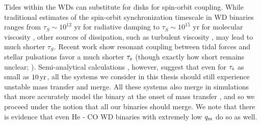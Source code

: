 Tides within the WDs can substitute for disks for spin-orbit coupling.  While traditional estimates of the spin-orbit synchronization timescale in WD binaries ranges from $\tau_{S} \sim 10^{12}$ yr for radiative damping to $\tau_{S} \sim 10^{15}$ yr for molecular viscosity \citep{marsns04}, other sources of dissipation, such as turbulent viscosity \citep{mochl89}, may lead to much shorter $\tau_{S}$.  Recent work \citep{fulll12, burk+13, fulll14} show resonant coupling between tidal forces and stellar pulsations favor a much shorter $\tau_\mathrm{s}$ (though exactly how short remains unclear; \citealt{fulll14}).  Semi-analytical calculations \citep{marsns04,gokhpf07, kremsk15}, however, suggest that even for $\tau_\mathrm{s}$ as small as $10\,\mathrm{yr}$, all the systems we consider in this thesis should still experience unstable mass transfer and merge.  All these systems also merge in simulations that more accurately model the binary at the onset of mass transfer \citep{dan+11, dan+12}, and so we proceed under the notion that all our binaries should merge.  We note that there is evidence \citep{shen15, brow+16} that even He - CO WD binaries with extremely low $\qm$ do so as well.





